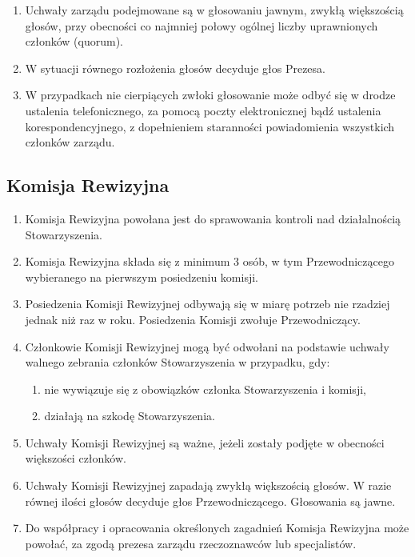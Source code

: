 \documentclass{article}
\begin{document}
\begin{enumerate}
\item
  Uchwały zarządu podejmowane są w głosowaniu jawnym, zwykłą większością głosów, przy obecności co najmniej połowy ogólnej liczby uprawnionych
  członków (quorum).
\item
  W sytuacji równego rozłożenia głosów decyduje głos Prezesa.
\item
  W przypadkach nie cierpiących zwłoki głosowanie może odbyć się w drodze ustalenia telefonicznego, za pomocą poczty elektronicznej bądź ustalenia korespondencyjnego, z dopełnieniem staranności powiadomienia wszystkich członków zarządu.
\end{enumerate}

\subsection*{Komisja Rewizyjna}
\begin{enumerate}
\item
  Komisja Rewizyjna powołana jest do sprawowania kontroli nad działalnością Stowarzyszenia.
\item
  Komisja Rewizyjna składa się z minimum 3 osób, w tym Przewodniczącego wybieranego na pierwszym posiedzeniu komisji.
\item
  Posiedzenia Komisji Rewizyjnej odbywają się w miarę potrzeb nie rzadziej jednak niż raz w roku. Posiedzenia Komisji zwołuje Przewodniczący.
\item
  Członkowie Komisji Rewizyjnej mogą być odwołani na podstawie uchwały walnego zebrania członków Stowarzyszenia w przypadku, gdy:
  \begin{enumerate}
  \def\labelenumii{\alph{enumii}.}
  \item
    nie wywiązuje się z obowiązków członka Stowarzyszenia i komisji,
  \item
    działają na szkodę Stowarzyszenia.
  \end{enumerate}
\item
  Uchwały Komisji Rewizyjnej są ważne, jeżeli zostały podjęte w obecności większości członków.
\item
  Uchwały Komisji Rewizyjnej zapadają zwykłą większością głosów. W razie równej ilości głosów decyduje głos Przewodniczącego. Głosowania są jawne.
\item
  Do współpracy i opracowania określonych zagadnień Komisja Rewizyjna może powołać, za zgodą prezesa zarządu rzeczoznawców lub specjalistów.
\end{enumerate}
\end{document}
